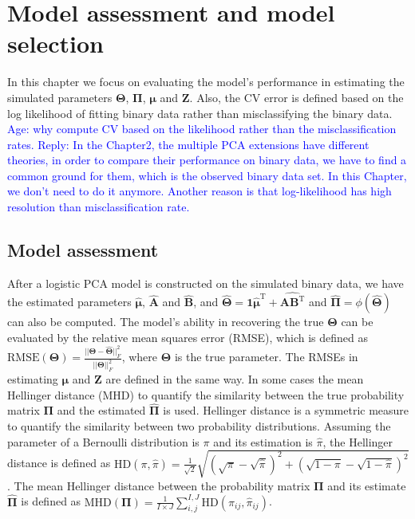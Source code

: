 \section{Model assessment and model selection}
In this chapter we focus on evaluating the model's performance in estimating the simulated parameters $\mathbf{\Theta}$, $\mathbf{\Pi}$, $\bm{\mu}$ and $\mathbf{Z}$. Also, the CV error is defined based on the log likelihood of fitting binary data rather than misclassifying the binary data. \textcolor{blue}{Age: why compute CV based on the likelihood rather than the misclassification rates. Reply: In the Chapter2, the multiple PCA extensions have different theories, in order to compare their performance on binary data, we have to find a common ground for them, which is the observed binary data set. In this Chapter, we don't need to do it anymore. Another reason is that log-likelihood has high resolution than misclassification rate.}

\subsection{Model assessment}
After a logistic PCA model is constructed on the simulated binary data, we have the estimated parameters $\hat{\bm{\mu}}$, $\hat{\mathbf{A}}$ and $\hat{\mathbf{B}}$, and $\hat{\mathbf{\Theta}} = \mathbf{1}\hat{\bm{\mu}}^{\text{T}} + \hat{\mathbf{AB}^{\text{T}}}$ and $\hat{\mathbf{\Pi}} = \phi(\hat{\mathbf{\Theta}})$ can also be computed.
The model's ability in recovering the true $\mathbf{\Theta}$ can be evaluated by the relative mean squares error (RMSE), which is defined as $\text{RMSE}(\mathbf{\Theta}) = \frac{||\mathbf{\Theta}-\hat{\mathbf{\Theta}}||_F^2}{||\mathbf{\Theta}||_F^2}$, where $\mathbf{\Theta}$ is the true parameter. The RMSEs in estimating $\bm{\mu}$ and $\mathbf{Z}$ are defined in the same way. In some cases the mean Hellinger distance (MHD) to quantify the similarity between the true probability matrix $\mathbf{\Pi}$ and the estimated $\hat{\mathbf{\Pi}}$ is used. Hellinger distance \cite{le2012asymptotics} is a symmetric measure to quantify the similarity between two probability distributions. Assuming the parameter of a Bernoulli distribution is $\pi$ and its estimation is $\hat{\pi}$, the Hellinger distance is defined as $\text{HD}(\pi,\hat{\pi}) = \frac{1}{\sqrt{2}}\sqrt{(\sqrt{\pi}-\sqrt{\hat{\pi}})^2 + (\sqrt{1-\pi}-\sqrt{1-\hat{\pi}})^2}$. The mean Hellinger distance between the probability matrix $\mathbf{\Pi}$ and its estimate $\hat{\mathbf{\Pi}}$ is defined as $\text{MHD}(\mathbf{\Pi}) =  \frac{1}{I\times J} \sum_{i,j}^{I,J}\text{HD}(\pi_{ij},\hat{\pi}_{ij})$.

